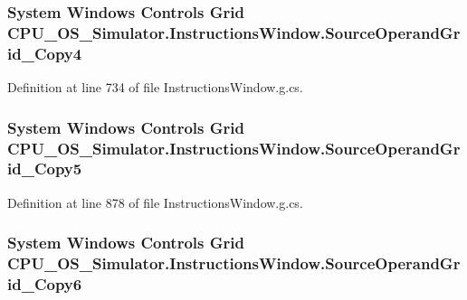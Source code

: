 \subsubsection[{Source\+Operand\+Grid\+\_\+\+Copy4}]{\setlength{\rightskip}{0pt plus 5cm}System Windows Controls Grid C\+P\+U\+\_\+\+O\+S\+\_\+\+Simulator.\+Instructions\+Window.\+Source\+Operand\+Grid\+\_\+\+Copy4\hspace{0.3cm}{\ttfamily [package]}}\label{class_c_p_u___o_s___simulator_1_1_instructions_window_aa8c70305e3c77644ac312df74b0696b7}


Definition at line 734 of file Instructions\+Window.\+g.\+cs.

\hypertarget{class_c_p_u___o_s___simulator_1_1_instructions_window_a5a43b8933f014dffe28d3aa610518a94}{}
\subsubsection[{Source\+Operand\+Grid\+\_\+\+Copy5}]{\setlength{\rightskip}{0pt plus 5cm}System Windows Controls Grid C\+P\+U\+\_\+\+O\+S\+\_\+\+Simulator.\+Instructions\+Window.\+Source\+Operand\+Grid\+\_\+\+Copy5\hspace{0.3cm}{\ttfamily [package]}}\label{class_c_p_u___o_s___simulator_1_1_instructions_window_a5a43b8933f014dffe28d3aa610518a94}


Definition at line 878 of file Instructions\+Window.\+g.\+cs.

\hypertarget{class_c_p_u___o_s___simulator_1_1_instructions_window_a3dfdd68ad6b08fb1612fd43a420e5193}{}
\subsubsection[{Source\+Operand\+Grid\+\_\+\+Copy6}]{\setlength{\rightskip}{0pt plus 5cm}System Windows Controls Grid C\+P\+U\+\_\+\+O\+S\+\_\+\+Simulator.\+Instructions\+Window.\+Source\+Operand\+Grid\+\_\+\+Copy6\hspace{0.3cm}{\ttfamily [package]}}\label{class_c_p_u___o_s___simulator_1_1_instructions_window_a3dfdd68ad6b08fb1612fd43a420e5193}


